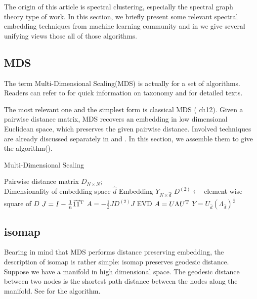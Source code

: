 The origin of this article is spectral clustering, 
especially the spectral graph theory type of work. 
In this section, we 
briefly present some relevant spectral embedding techniques 
from machine learning community and in 
\rsec{\ref{sec:unify}} we give several unifying views
those all of those algorithms. 

\subsection{MDS}
\label{sec:mds}

The term Multi-Dimensional Scaling(MDS) 
\cite{cox2008mds} is actually for a set of algorithms. 
Readers can refer to \cite{wiki_mds} for quick information
on taxonomy and 
\cite{borg2005modern} for detailed texts. 

The most relevant one and the simplest form is classical MDS
(\cite{borg2005modern} ch12). Given a pairwise distance matrix, 
MDS recovers an embedding in low dimensional Euclidean space, 
which preserves the given pairwise distance. 
Involved techniques are already discussed separately in 
\rsec{\ref{sec:proximity}} and \rsec{\ref{sec:lrapprox}}. In 
this section, we assemble them to give the algorithm(\ralg{\ref{alg:mds}}). 

\begin{algorithm}[htb]
	\caption{Multi-Dimensional Scaling}
	\label{alg:mds}
	\begin{algorithmic}[1]
		\REQUIRE Pairwise distance matrix $ D_{N \times N} $; \\
			Dimensionality of embedding space $ \hat{d} $
		\ENSURE Embedding $ Y_{N \times \hat{d}} $
		\STATE $ D^{(2)} \leftarrow$ element wise square of $ D $
		\STATE $ J = I - \frac{1}{n} \vec{1} \vec{1}^\mathrm{T} $
		\STATE $ A = -\frac{1}{2}JD^{(2)}J $
		\STATE EVD $ A = U \Lambda U^\mathrm{T} $ 
		\STATE $ Y = U_{\hat{d}} (\Lambda_{\hat{d}})^{\frac{1}{2}} $
	\end{algorithmic}
\end{algorithm}

\subsection{isomap}
\label{sec:isomap}

Bearing in mind that MDS performs distance preserving 
embedding, the description of isomap \cite{tenenbaum2000isomap}
is rather simple: isomap preserves geodesic distance. 
Suppose we have a manifold in high dimensional space. 
The geodesic distance between two nodes 
is the shortest path distance between the nodes 
along the manifold. 
See \ralg{\ref{alg:isomap}} for the algorithm. 

